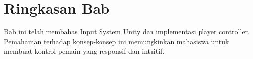 \section{Ringkasan Bab}

Bab ini telah membahas Input System Unity dan implementasi player controller. Pemahaman terhadap konsep-konsep ini memungkinkan mahasiswa untuk membuat kontrol pemain yang responsif dan intuitif.
